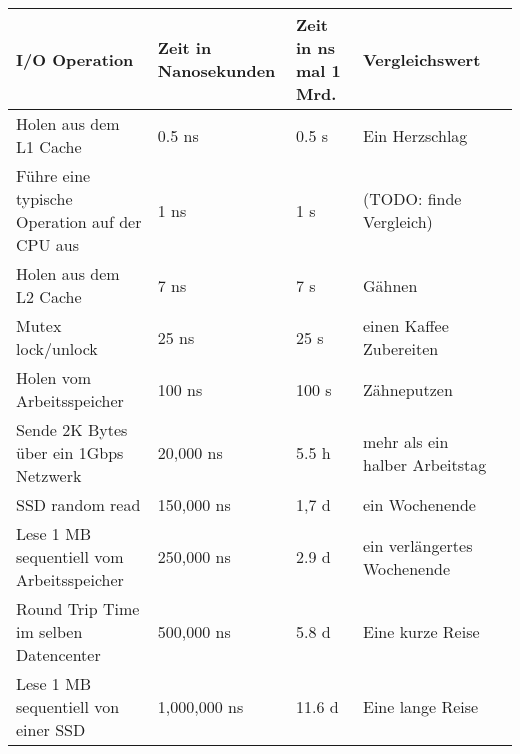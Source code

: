 \begin{table}[h]
\begin{tabular}{@{}lllll@{}}
\toprule
\textbf{I/O Operation}                                     & \textbf{Zeit in Nanosekunden} & \textbf{Zeit in ns mal 1 Mrd.} & \textbf{Vergleichswert}                                    &  \\ \midrule
Holen aus dem L1 Cache                                     & 0.5 ns                        & 0.5 s                          & Ein Herzschlag                                             &  \\
Führe eine typische Operation auf der CPU aus              & 1 ns                          & 1 s                            & (TODO: finde Vergleich)                                    &  \\
Holen aus dem L2 Cache                                     & 7 ns                          & 7 s                            & Gähnen                                                     &  \\
Mutex lock/unlock                                          & 25 ns                         & 25 s                           & einen Kaffee Zubereiten                                    &  \\
Holen vom Arbeitsspeicher                                  & 100 ns                        & 100 s                          & Zähneputzen                                                &  \\
Sende 2K Bytes über ein 1Gbps Netzwerk                     & 20,000 ns                     & 5.5 h                          & mehr als ein halber Arbeitstag                             &  \\
SSD random read                                            & 150,000 ns                    & 1,7 d                          & ein Wochenende                                             &  \\
Lese 1 MB sequentiell vom Arbeitsspeicher                  & 250,000 ns                    & 2.9 d                          & ein verlängertes Wochenende                                &  \\
Round Trip Time im selben Datencenter                      & 500,000 ns                    & 5.8 d                          & Eine kurze Reise                                           &  \\
Lese 1 MB sequentiell von einer SSD                        & 1,000,000 ns                  & 11.6 d                         & Eine lange Reise                                           &  \\

\end{tabular}
\end{table}
